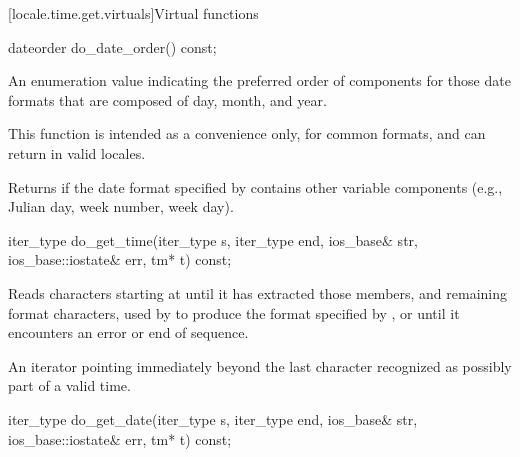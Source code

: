 [locale.time.get.virtuals]{Virtual functions}

%
\begin{itemdecl}
dateorder do_date_order() const;
\end{itemdecl}

\begin{itemdescr}
\pnum
\returns
An enumeration value indicating the preferred order of components
for those date formats that are composed of day, month, and year.
\begin{footnote}
This function is intended as a convenience only, for common formats, and
can return  in valid locales.
\end{footnote}
Returns  if the date format specified by 
contains other variable components (e.g., Julian day, week number, week day).
\end{itemdescr}

%
\begin{itemdecl}
iter_type do_get_time(iter_type s, iter_type end, ios_base& str,
                      ios_base::iostate& err, tm* t) const;
\end{itemdecl}

\begin{itemdescr}
\pnum
\effects
Reads characters starting at 
until it has extracted those  members, and
remaining format characters,
used by 
to produce the format specified by ,
or until it encounters an error or end of sequence.

\pnum
\returns
An iterator pointing immediately beyond
the last character recognized as possibly part of a valid time.
\end{itemdescr}

%
\begin{itemdecl}
iter_type do_get_date(iter_type s, iter_type end, ios_base& str,
                      ios_base::iostate& err, tm* t) const;
\end{itemdecl}

